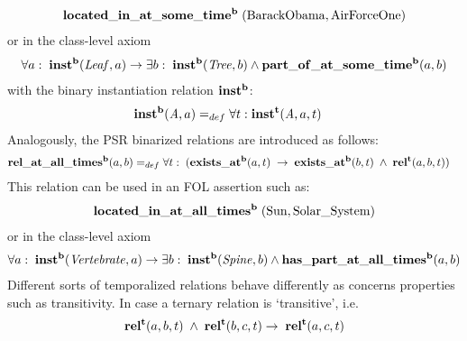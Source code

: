 \begin{equation}
\begin{split}
\mathrm{\mathbf{located\_in\_at\_some\_time^b}} \;(\mathrm{BarackObama}, \mathrm{AirForceOne})  
\end{split}
\label{eq:personlocated}
\end{equation}
%
or in the class-level axiom
%
\begin{equation}
\begin{split}
\forall a:\; \mathrm{\mathbf{inst^b}}(\mathit{Leaf}, a) 
\rightarrow
\exists b:\;\mathrm{\mathbf{inst^b}}(\mathit{Tree}, b)
\wedge
\mathrm{\mathbf{part\_of\_at\_some\_time^b}}(a,b)  \end{split}
\label{eq:leaf2}
\end{equation}
%
with the binary instantiation relation $\mathrm{\mathbf{inst^b}}$:
%  
\begin{equation}
\begin{split}
\mathrm{\mathbf{inst^b}} (\mathit{A},a) =_{def}&\; \forall t: \mathrm{\mathbf{inst^t}}(\mathit{A},a,t)  
\end{split}
\label{eq:temporarily:inst}
\end{equation}
%
Analogously, the PSR binarized relations are introduced as follows:  
%
\begin{equation}
\begin{split}
\mathrm{\mathbf{rel\_at\_all\_times^b}} (a,b) =_{def}&\;
\forall t: \; (\mathrm{\mathbf{exists\_at^b}} (a, t) \; \rightarrow \; \mathrm{\mathbf{exists\_at^b}} (b, t) \; \wedge \; \mathrm{\mathbf{rel^t}}(a,b,t))  
\end{split}
\label{eq:permanently:ind}
\end{equation}
%
This relation can be used in an FOL assertion such as:
%
\begin{equation}
\begin{split}
\mathrm{\mathbf{located\_in\_at\_all\_times^b}} \;(\mathrm{Sun}, \mathrm{Solar\_System})  
\end{split}
\label{eq:earth}
\end{equation}
%
or in the class-level axiom
%
\begin{equation}
\begin{split}
\forall a:\; \mathrm{\mathbf{inst^b}}(\mathit{Vertebrate}, a) 
\rightarrow
\exists b:\;\mathrm{\mathbf{inst^b}}(\mathit{Spine}, b)
\wedge
\mathrm{\mathbf{has\_part\_at\_all\_times^b}}(a,b)  \end{split}
\label{eq:spine}
\end{equation}
%  
Different sorts of temporalized relations behave differently as concerns properties such as transitivity.
In case a ternary relation is `transitive', i.e.  
%
\begin{equation}
\begin{split}
\mathrm{\mathbf{rel^t}}(a,b,t) \; \wedge \; \mathrm{\mathbf{rel^t}}(b,c,t) \rightarrow \; \mathrm{\mathbf{rel^t}}(a,c,t)   
\end{split}
\label{eq:trtrans}
\end{equation}    
